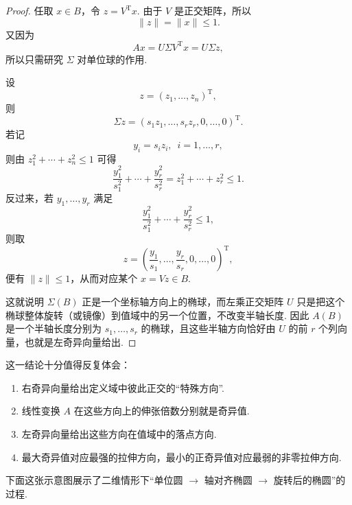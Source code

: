 \begin{proof}
    任取 $x \in B$，令 $z = V^{\mathrm{T}}x$. 由于 $V$ 是正交矩阵，所以
    \[
        \lVert z \rVert = \lVert x \rVert \leqslant 1.
    \]
    又因为
    \[
        Ax = U\Sigma V^{\mathrm{T}}x = U\Sigma z,
    \]
    所以只需研究 $\Sigma$ 对单位球的作用.

    设
    \[
        z = (z_1, \ldots, z_n)^{\mathrm{T}},
    \]
    则
    \[
        \Sigma z = (s_1z_1, \ldots, s_rz_r, 0, \ldots, 0)^{\mathrm{T}}.
    \]
    若记
    \[
        y_i = s_i z_i,\enspace i = 1, \ldots, r,
    \]
    则由 $z_1^2 + \cdots + z_n^2 \leqslant 1$ 可得
    \[
        \frac{y_1^2}{s_1^2} + \cdots + \frac{y_r^2}{s_r^2}
        = z_1^2 + \cdots + z_r^2
        \leqslant 1.
    \]
    反过来，若 $y_1, \ldots, y_r$ 满足
    \[
        \frac{y_1^2}{s_1^2} + \cdots + \frac{y_r^2}{s_r^2} \leqslant 1,
    \]
    则取
    \[
        z = \left( \frac{y_1}{s_1}, \ldots, \frac{y_r}{s_r}, 0, \ldots, 0 \right)^{\mathrm{T}},
    \]
    便有 $\lVert z \rVert \leqslant 1$，从而对应某个 $x = Vz \in B$.

    这就说明 $\Sigma(B)$ 正是一个坐标轴方向上的椭球，而左乘正交矩阵 $U$ 只是把这个椭球整体旋转（或镜像）到值域中的另一个位置，不改变半轴长度. 因此 $A(B)$ 是一个半轴长度分别为 $s_1, \ldots, s_r$ 的椭球，且这些半轴方向恰好由 $U$ 的前 $r$ 个列向量，也就是左奇异向量给出.
\end{proof}

这一结论十分值得反复体会：
\begin{enumerate}
    \item 右奇异向量给出定义域中彼此正交的“特殊方向”.

    \item 线性变换 $A$ 在这些方向上的伸张倍数分别就是奇异值.

    \item 左奇异向量给出这些方向在值域中的落点方向.

    \item 最大奇异值对应最强的拉伸方向，最小的正奇异值对应最弱的非零拉伸方向.
\end{enumerate}

下面这张示意图展示了二维情形下“单位圆 $\to$ 轴对齐椭圆 $\to$ 旋转后的椭圆”的过程.


